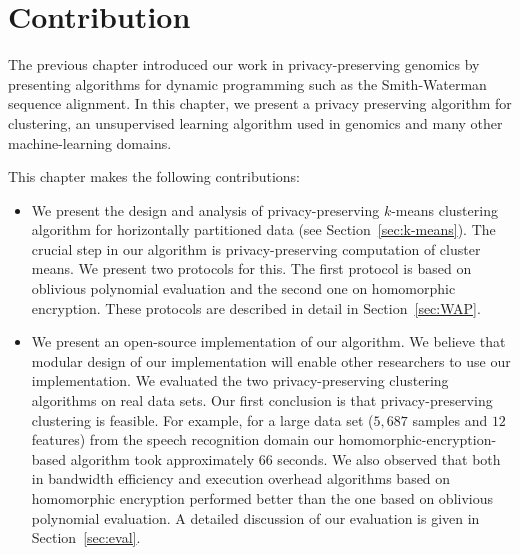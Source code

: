 
\section{Contribution}
The previous chapter introduced our work in privacy-preserving
genomics by presenting algorithms for dynamic programming such
as the Smith-Waterman sequence alignment.  In this chapter,
we present a privacy preserving algorithm for clustering, an
unsupervised learning algorithm used in genomics and many other
machine-learning domains.

This chapter makes the following contributions:

\begin{itemize}
\item We present the design and analysis of privacy-preserving $k$-means
clustering algorithm for horizontally partitioned data (see
Section~\ref{sec:k-means}). The crucial step in our algorithm is
privacy-preserving computation of cluster means. We present two protocols for
this. The first protocol is
based on oblivious polynomial evaluation and the second one on
homomorphic encryption. These protocols are described in detail in
Section~\ref{sec:WAP}.

\item We present an open-source implementation of our algorithm. 
We believe that modular design of our implementation will enable other
researchers to use our implementation.  We evaluated the two privacy-preserving
clustering algorithms on real data sets. Our first conclusion is that
privacy-preserving clustering is feasible. For example, for a large
data set ($5,687$ samples and $12$ features) from the speech
recognition domain our homomorphic-encryption-based algorithm took
approximately $66$ seconds. We also observed that both in bandwidth
efficiency and execution overhead algorithms based on homomorphic
encryption performed better than the one based on oblivious polynomial
evaluation. A detailed discussion of our evaluation is given in
Section~\ref{sec:eval}.

\end{itemize}


